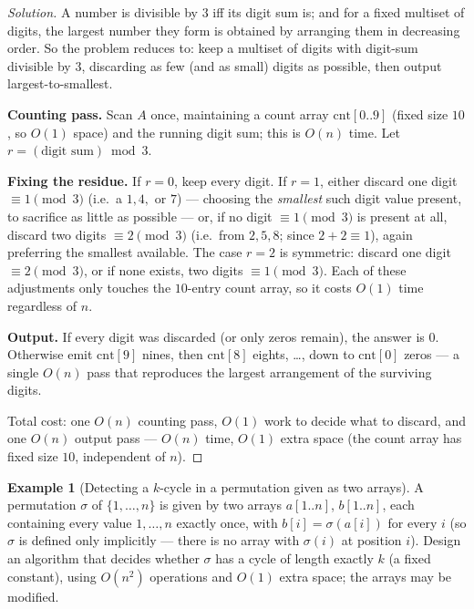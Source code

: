 \documentclass[11pt]{article}
\theoremstyle{definition}
\newtheorem{example}{Example}[section]
\begin{document}
\begin{proof}[Solution]
A number is divisible by $3$ iff its digit sum is; and for a fixed multiset of digits, the largest number they form is obtained by arranging them in decreasing order. So the problem reduces to: keep a multiset of digits with digit-sum divisible by $3$, discarding as few (and as small) digits as possible, then output largest-to-smallest.

\textbf{Counting pass.} Scan $A$ once, maintaining a count array $\mathrm{cnt}[0..9]$ (fixed size $10$, so $O(1)$ space) and the running digit sum; this is $O(n)$ time. Let $r=(\text{digit sum})\bmod 3$.

\textbf{Fixing the residue.} If $r=0$, keep every digit. If $r=1$, either discard one digit $\equiv1\pmod3$ (i.e.\ a $1,4,$ or $7$) — choosing the \emph{smallest} such digit value present, to sacrifice as little as possible — or, if no digit $\equiv1\pmod3$ is present at all, discard two digits $\equiv2\pmod3$ (i.e.\ from $2,5,8$; since $2+2\equiv1$), again preferring the smallest available. The case $r=2$ is symmetric: discard one digit $\equiv2\pmod3$, or if none exists, two digits $\equiv1\pmod3$. Each of these adjustments only touches the $10$-entry count array, so it costs $O(1)$ time regardless of $n$.

\textbf{Output.} If every digit was discarded (or only zeros remain), the answer is $0$. Otherwise emit $\mathrm{cnt}[9]$ nines, then $\mathrm{cnt}[8]$ eights, \dots, down to $\mathrm{cnt}[0]$ zeros — a single $O(n)$ pass that reproduces the largest arrangement of the surviving digits.

Total cost: one $O(n)$ counting pass, $O(1)$ work to decide what to discard, and one $O(n)$ output pass — $O(n)$ time, $O(1)$ extra space (the count array has fixed size $10$, independent of $n$).
\end{proof}

\begin{example}[Detecting a $k$-cycle in a permutation given as two arrays]
A permutation $\sigma$ of $\{1,\dots,n\}$ is given by two arrays $a[1..n]$, $b[1..n]$, each containing every value $1,\dots,n$ exactly once, with $b[i]=\sigma(a[i])$ for every $i$ (so $\sigma$ is defined only implicitly — there is no array with $\sigma(i)$ at position $i$). Design an algorithm that decides whether $\sigma$ has a cycle of length exactly $k$ (a fixed constant), using $O(n^2)$ operations and $O(1)$ extra space; the arrays may be modified.
\end{example}
\end{document}

